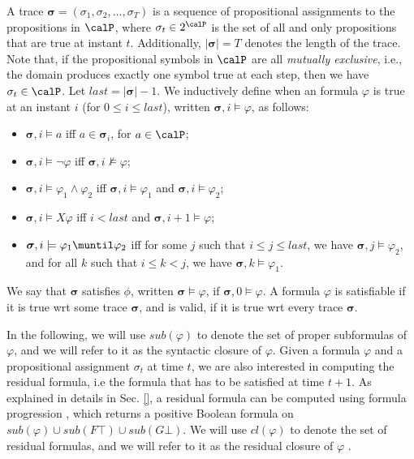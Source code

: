 A trace $\boldsymbol{\sigma} = (\sigma_{1}, \sigma_{2}, \dots, \sigma_{T})$ is a sequence of propositional assignments to the propositions in $\calP$, where $\sigma_{t} \in 2^\calP$ is the set of all and only propositions that are true at instant $t$. Additionally, $|\boldsymbol{\sigma}| = T$ denotes the length of the trace. 
Note that, if the propositional symbols in $\calP$ are all \textit{mutually exclusive}, i.e., the domain produces exactly one symbol true at each step, then we have $\sigma_{t} \in \calP$.
%
Let $last = |\boldsymbol{\sigma}| - 1$. We inductively define when
an \ltlf formula $\varphi$ is true at an instant $i$ (for $0 \leq i \leq last$), written $\boldsymbol{\sigma},i \models \varphi$, as follows:
\begin{itemize}
    \item $\boldsymbol{\sigma}, i \models a$ iff $a \in \boldsymbol{\sigma}_i$, for $a \in \calP$;
    \item $\boldsymbol{\sigma}, i \models \neg \varphi$ iff $\boldsymbol{\sigma}, i \not\models \varphi$;
    \item $\boldsymbol{\sigma}, i \models \varphi_1 \land \varphi_2$ iff $\boldsymbol{\sigma}, i \models \varphi_1$ and $\boldsymbol{\sigma}, i \models \varphi_2$;
    \item $\boldsymbol{\sigma}, i \models X\varphi$ iff $i < last$ and  $\boldsymbol{\sigma}, i + 1 \models \varphi$;
    \item $\boldsymbol{\sigma}, i \models \varphi_1 \muntil \varphi_2$ iff for some $j$ such that $i \leq j \leq last$, we have $\boldsymbol{\sigma}, j \models \varphi_2$, and for all $k$ such that $i \leq k < j$, we have $\boldsymbol{\sigma}, k \models \varphi_1$.
\end{itemize}
%
\noindent
We say that $\boldsymbol{\sigma}$ satisfies $\phi$, written $\boldsymbol{\sigma} \models \varphi$, if $\boldsymbol{\sigma}, 0 \models \varphi$. A formula $\varphi$ is satisfiable if it is true wrt some trace $\boldsymbol{\sigma}$, and is valid, if it is true wrt every trace $\boldsymbol{\sigma}$.

In the following, we will use $sub(\varphi)$ to denote the set of proper subformulas of $\varphi$, and we will refer to it as the syntactic closure of $\varphi$. Given a formula $\varphi$ and a propositional assignment $\sigma_t$ at time $t$, we are also interested in computing the residual formula, i.e the formula that has to be satisfied at time $t+1$. As explained in details in Sec. \ref{}, a residual formula can be computed using formula progression \cite{}, which returns a positive Boolean formula on $sub(\varphi) \cup sub(F \top) \cup sub(G \bot)$. We will use $cl(\varphi)$ to denote the set of residual formulas, and we will refer to it as the residual closure of $\varphi$ .

